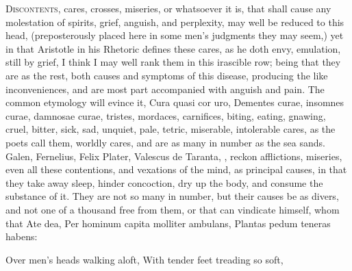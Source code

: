 {\lettrine{D}{iscontents}, cares, crosses, miseries, or whatsoever it is, that shall
cause any molestation of spirits, grief, anguish, and perplexity, may
well be reduced to this head, (preposterously placed here in some men's
judgments they may seem,) yet in that Aristotle in his Rhetoric
defines these cares, as he doth envy, emulation, \etc{} still by grief, I
think I may well rank them in this irascible row; being that they are
as the rest, both causes and symptoms of this disease, producing the
like inconveniences, and are most part accompanied with anguish and
pain. The common etymology will evince it, Cura quasi cor uro, Dementes
curae, insomnes curae, damnosae curae, tristes, mordaces, carnifices,
\etc{} biting, eating, gnawing, cruel, bitter, sick, sad, unquiet, pale,
tetric, miserable, intolerable cares, as the poets call them,
worldly cares, and are as many in number as the sea sands. Galen,
Fernelius, Felix Plater, Valescus de Taranta, \etc{}, reckon afflictions,
miseries, even all these contentions, and vexations of the mind, as
principal causes, in that they take away sleep, hinder concoction, dry
up the body, and consume the substance of it. They are not so many in
number, but their causes be as divers, and not one of a thousand free
from them, or that can vindicate himself, whom that Ate dea,
Per hominum capita molliter ambulans,
Plantas pedum teneras habens:

Over men's heads walking aloft,
With tender feet treading so soft,

}
